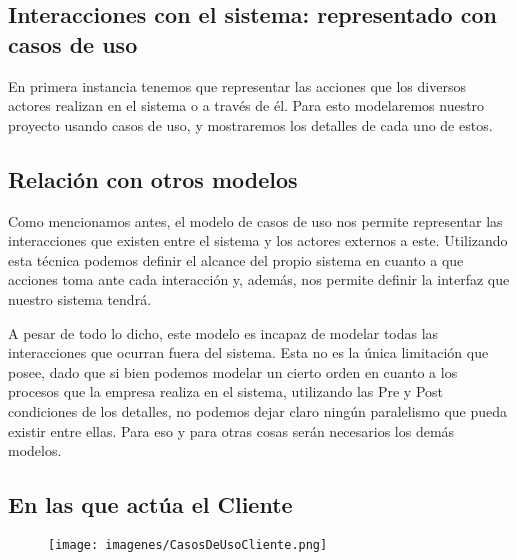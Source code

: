 \subsection{Interacciones con  el sistema: representado con casos de uso}

En primera instancia tenemos que representar las acciones que los diversos actores realizan en el sistema o a través de él. Para esto modelaremos nuestro proyecto usando casos de uso, y
mostraremos los detalles de cada uno de estos.

\subsection{Relación con otros modelos}

Como mencionamos antes, el modelo de casos de uso nos permite representar las interacciones que existen entre
el sistema y los actores externos a este. Utilizando esta técnica podemos definir el alcance del propio sistema
en cuanto a que acciones toma ante cada interacción y, además, nos permite definir la interfaz que nuestro
sistema tendrá.

A pesar de todo lo dicho, este modelo es incapaz de modelar todas las interacciones que ocurran fuera del sistema.
Esta no es la única limitación que posee, dado que si bien podemos modelar un cierto orden en cuanto a los procesos
que la empresa realiza en el sistema, utilizando las Pre y Post condiciones de los detalles, no podemos dejar
claro ningún paralelismo que pueda existir entre ellas. Para eso y para otras cosas serán necesarios los demás modelos.

\subsection{En las que actúa el Cliente}

\begin{figure}[H]
    \texttt{[image: imagenes/CasosDeUsoCliente.png]}
\end{figure}

